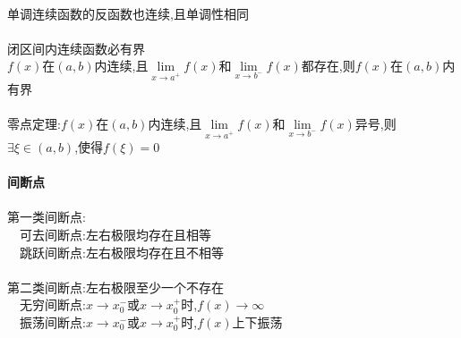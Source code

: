 \documentclass{article}
\begin{document}
\begin{flushleft}
	~\\
	单调连续函数的反函数也连续,且单调性相同\\
	~\\
	闭区间内连续函数必有界\\
	$f(x)$在$(a,b)$内连续,且$\lim\limits_{x\to a^+} f(x)$和$\lim\limits_{x\to b^-} f(x)$都存在,则$f(x)$在$(a,b)$内有界\\
	~\\
	零点定理:$f(x)$在$(a,b)$内连续,且$\lim\limits_{x\to a^+} f(x)$和$\lim\limits_{x\to b^-} f(x)$异号,则$\exists \xi \in (a,b)$,使得$f(\xi)=0$\\
	~\\ \textbf{间断点}\\~\\
	第一类间断点:\\
	\ \ 可去间断点:左右极限均存在且相等\\
	\ \ 跳跃间断点:左右极限均存在且不相等\\
	~\\
	第二类间断点:左右极限至少一个不存在\\
	\ \ 无穷间断点:$x\to x_0^-$或$x\to x_0^+$时,$f(x)\to \infty$\\
	\ \ 振荡间断点:$x\to x_0^-$或$x\to x_0^+$时,$f(x)$上下振荡\\

\end{flushleft}
\end{document}
